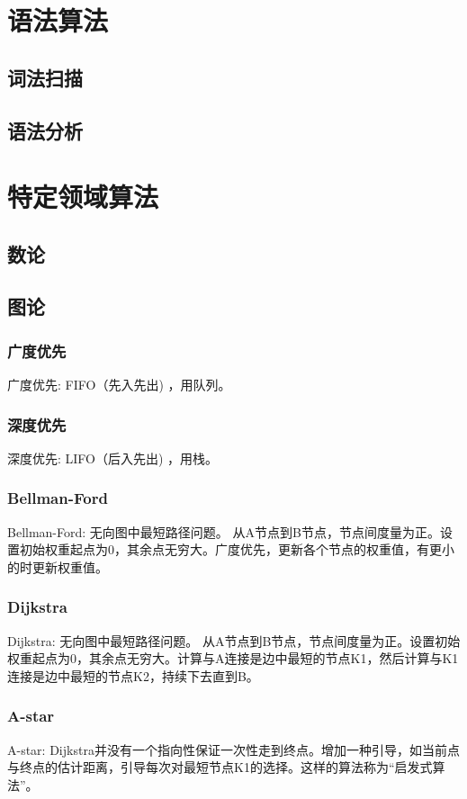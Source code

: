 \documentclass[UTF8]{../computerUniverse}
\begin{document}
\chapter{语法算法}
\section{词法扫描}
\section{语法分析}



\chapter{特定领域算法}

\section{数论}


\section{图论}

\subsection{广度优先}
广度优先: FIFO（先入先出) ，用队列。


\subsection{深度优先}
深度优先: LIFO（后入先出) ，用栈。


\subsection{Bellman-Ford}
Bellman-Ford: 无向图中最短路径问题。
从A节点到B节点，节点间度量为正。设置初始权重起点为0，其余点无穷大。广度优先，更新各个节点的权重值，有更小的时更新权重值。


\subsection{Dijkstra}
Dijkstra: 无向图中最短路径问题。
从A节点到B节点，节点间度量为正。设置初始权重起点为0，其余点无穷大。计算与A连接是边中最短的节点K1，然后计算与K1连接是边中最短的节点K2，持续下去直到B。


\subsection{A-star}
A-star: Dijkstra并没有一个指向性保证一次性走到终点。增加一种引导，如当前点与终点的估计距离，引导每次对最短节点K1的选择。这样的算法称为“启发式算法”。
\end{document}
